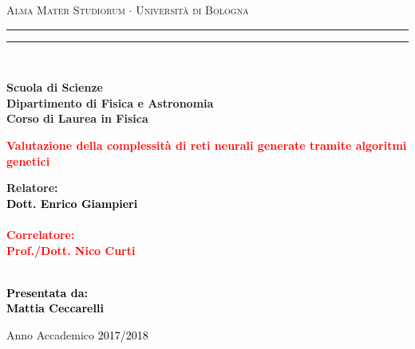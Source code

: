 \documentclass[12pt,a4paper]{report}
\begin{document}
\begin{titlepage}

%
%
%
%
\begin{center}
{{\Large{\textsc{Alma Mater Studiorum $\cdot$ Universit\`a di Bologna}}}} 
\rule[0.1cm]{15.8cm}{0.1mm}
\rule[0.5cm]{15.8cm}{0.6mm}
\\\vspace{3mm}

{\small{\bf Scuola di Scienze \\ 
Dipartimento di Fisica e Astronomia\\
Corso di Laurea in Fisica}}

\end{center}

\vspace{23mm}

\begin{center}\textcolor{red}{
%
%
{\LARGE{\bf Valutazione della complessità di reti neurali generate tramite algoritmi genetici}}\\
}\end{center}

\vspace{50mm} \par \noindent

\begin{minipage}[t]{0.47\textwidth}
%
%
{\large{\bf Relatore: \vspace{2mm}\\\textcolor{black}{
Dott. Enrico Giampieri}\\\\
%
%
%
\textcolor{red}{
\bf Correlatore: 
\vspace{2mm}\\
Prof./Dott. Nico Curti\\\\}}}
\end{minipage}
%
\hfill
%
\begin{minipage}[t]{0.47\textwidth}\raggedleft \textcolor{black}{
{\large{\bf Presentata da:
\vspace{2mm}\\
%
%
Mattia Ceccarelli}}}
\end{minipage}

\vspace{38mm} %

\begin{center}
%
%
Anno Accademico \textcolor{black}{ 2017/2018}
\end{center}

\end{titlepage}
\end{document}
